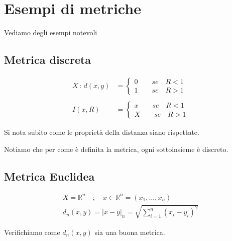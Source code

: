 \section{Esempi di metriche}

Vediamo degli esempi notevoli

\subsection{Metrica discreta}

\begin{align}
X \, : \, d(x,y) {}&= \left\{
\begin{array}{cc}
0  \qquad se \quad R<1\\
1  \qquad se \quad R>1
\end{array}
\right. \\
\nonumber \\
I(x,R) &= \left\{
\begin{array}{cc}
x  \qquad se \quad R<1\\
X  \qquad se \quad R>1
\end{array}
\right.
\end{align}

Si nota subito come le proprietà della distanza siano rispettate.

Notiamo che per come è definita la metrica, ogni sottoinsieme è discreto.

\newpage

\subsection{Metrica Euclidea}

\begin{align}
X= \mathbb{R}^n \quad ; \quad x \in \mathbb{R}^n = (x_1, \dots , x_n) \\
d_n(x,y)= |x-y|_n = \sqrt{\sum_{i=1}^{n} (x_i - y_i)^2}
\end{align}

Verifichiamo come $d_n(x,y)$ sia una buona metrica.


